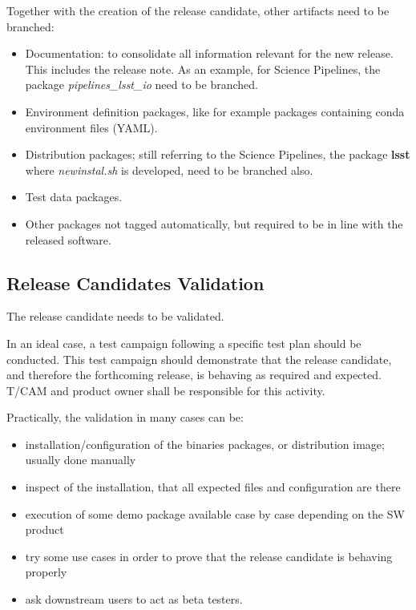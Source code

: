 Together with the creation of the release candidate, other artifacts need to be branched:

\begin{itemize}
\item Documentation: to consolidate all information relevant for the new release. This includes the release note.
As an example, for Science Pipelines, the package \textit{pipelines\_lsst\_io} need to be branched.
\item Environment definition packages, like for example packages containing conda environment files (YAML).
\item Distribution packages; still referring to the Science Pipelines, the package \textbf{lsst}  where \textit{newinstal.sh} is developed, need to be branched also.
\item Test data packages.
\item Other packages not tagged automatically, but required to be in line with the released software.
\end{itemize}


\subsection{Release Candidates Validation} \label{sec:rcvalidation}

The release candidate needs to be validated.

In an ideal case, a test campaign following a specific test plan should be conducted.
This test campaign should demonstrate that the release candidate, and therefore the forthcoming release, is behaving as required and expected.
T/CAM and product owner shall be responsible for this activity.

Practically, the validation in many cases can be:

\begin{itemize}
\item installation/configuration of the binaries packages, or distribution image; usually done manually
\item inspect of the installation, that all expected files and configuration are there
\item execution of some demo package available case by case depending on the SW product
\item try some use cases in order to prove that the release candidate is behaving properly
\item ask downstream users to act as beta testers.
\end{itemize}


